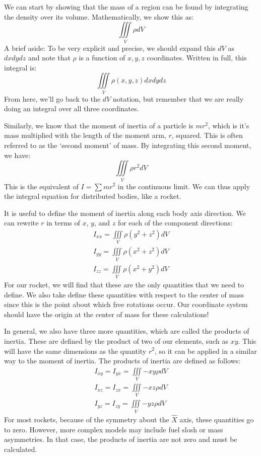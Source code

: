 \documentclass[10pt, openany, titlepage]{book}
\theoremstyle{definition}
\begin{document}
We can start by showing that the mass of a region can be found by integrating the density over its volume. Mathematically, we show this as:
$$\iiint\limits_V{\rho}{dV}$$
A brief aside: To be very explicit and precise, we should expand this $dV$ as $dxdydz$ and note that $\rho$ is a function of $x,y,z$ coordinates. Written in full, this integral is:
$$\iiint\limits_V{\rho(x,y,z)}{dxdydz}$$
From here, we'll go back to the $dV$ notation, but remember that we are really doing an integral over all three coordinates.

Similarly, we know that the \gls{moment of inertia} of a particle is $mr^2$, which is it's mass multiplied with the length of the moment arm, $r$, squared. This is often referred to as the `second moment' of mass. By integrating this second moment, we have:
$$\iiint\limits_V{\rho}{r^2}{dV}$$
This is the equivalent of $I=\sum mr^2$ in the continuous limit. We can thus apply the integral equation for distributed bodies, like a rocket.

It is useful to define the \gls{moment of inertia} along each body axis direction. We can rewrite $r$ in terms of $x$, $y$, and $z$ for each of the component directions:
\begin{gather}\label{eq:moi}
    I_{xx}=\iiint\limits_V{\rho}{\left(y^2+z^2\right)}{dV}\\
    I_{yy}=\iiint\limits_V{\rho}{\left(x^2+z^2\right)}{dV}\\
    I_{zz}=\iiint\limits_V{\rho}{\left(x^2+y^2\right)}{dV}
\end{gather}
For our rocket, we will find that these are the only quantities that we need to define. We also take define these quantities with respect to the center of mass since this is the point about which free rotations occur. Our coordinate system should have the origin at the center of mass for these calculations!

In general, we also have three more quantities, which are called the products of inertia. These are defined by the product of two of our elements, such as $xy$. This will have the same dimensions as the quantity $r^2$, so it can be applied in a similar way to the \gls{moment of inertia}. The products of inertia are defined as follows:
\begin{gather}
    I_{xy}=I_{yx}=\iiint\limits_V{-xy\rho}{dV}\\
    I_{xz}=I_{zx}=\iiint\limits_V{-xz\rho}{dV}\\
    I_{yz}=I_{zy}=\iiint\limits_V{-yz\rho}{dV}
\end{gather}
For most rockets, because of the symmetry about the $\hat{X}$ axis, these quantities go to zero. However, more complex models may include fuel slosh or mass asymmetries. In that case, the products of inertia are not zero and must be calculated.
\end{document}
